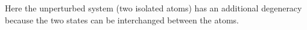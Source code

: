 Here the unperturbed system (two isolated atoms) has an additional degeneracy because the two states can be interchanged between the atoms.
